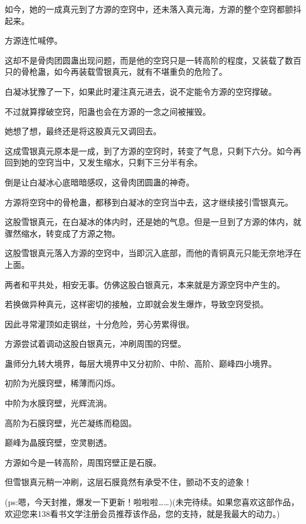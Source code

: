 \begin{this_body}
如今，她的一成真元到了方源的空窍中，还未落入真元海，方源的整个空窍都颤抖起来。

方源连忙喊停。

这却不是骨肉团圆蛊出现问题，而是他的空窍只是一转高阶的程度，又装载了数百只的骨枪蛊，如今再装载雪银真元，就有不堪重负的危险了。

白凝冰犹豫了一下，如果此时灌注真元进去，说不定能令方源的空窍撑破。

不过就算撑破空窍，阳蛊也会在方源的一念之间被摧毁。

她想了想，最终还是将这股真元又调回去。

这成雪银真元原本是一成，到了方源的空窍时，转变了气息，只剩下六分。如今再回到她的空窍当中，又发生缩水，只剩下三分半有余。

倒是让白凝冰心底暗暗感叹，这骨肉团圆蛊的神奇。

方源将空窍中的骨枪蛊，都移到白凝冰的空窍当中去，这才继续接引雪银真元。

这股雪银真元，在白凝冰的体内时，还是她的气息。但是一旦到了方源的体内，就骤然缩水，转变成了方源之物。

这股雪银真元落入方源的空窍中，当即沉入底部，而他的青铜真元只能无奈地浮在上面。

两者和平共处，相安无事。仿佛这股白银真元，本来就是方源空窍中产生的。

若换做异种真元，这样密切的接触，立即就会发生爆炸，导致空窍受损。

因此寻常灌顶如走钢丝，十分危险，劳心劳累得很。

方源尝试着调动这股白银真元，冲刷周围的窍壁。

蛊师分九转大境界，每层大境界中又分初阶、中阶、高阶、巅峰四小境界。

初阶为光膜窍壁，稀薄而闪烁。

中阶为水膜窍壁，光辉流淌。

高阶为石膜窍壁，光芒凝练而稳固。

巅峰为晶膜窍壁，空灵剔透。

方源如今是一转高阶，周围窍壁正是石膜。

但雪银真元稍一冲刷，这层石膜竟然有承受不住，颤动不支的迹象！

(ps:嗯，今天封推，爆发一下更新！啦啦啦……)(未完待续。如果您喜欢这部作品，欢迎您来138看书文学注册会员推荐该作品，您的支持，就是我最大的动力。)

\end{this_body}

